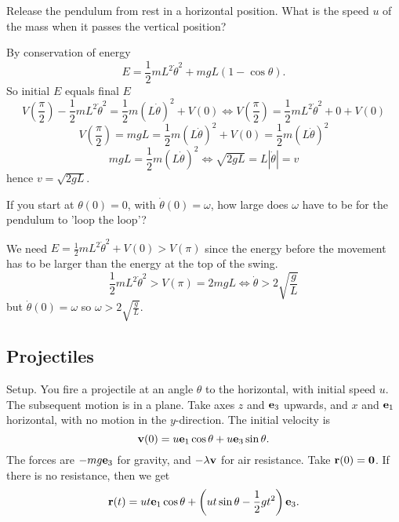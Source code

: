 \documentclass[10pt, a4paper]{article}
\begin{document}
\begin{example}
    Release the pendulum from rest in a horizontal position.
    What is the speed $u$ of the mass when it passes the vertical position?

    \begin{solution}
        By conservation of energy
        \[
        E = \frac{1}{2}mL ^ 2\dot{\theta} ^ 2 + mgL(1 - \cos{\theta}).
        \]
        So initial $E$ equals final $E$
        \[
        V\left(\frac{\pi}{2}\right) - \frac{1}{2}mL ^ 2\dot{\theta} ^ 2 = \frac{1}{2}m(L\dot{\theta}) ^ 2 + V(0) \iff V\left(\frac{\pi}{2}\right) = \frac{1}{2}mL ^ 2\dot{\theta} ^ 2 + 0 + V(0)
        \]
        \[
        V\left(\frac{\pi}{2}\right) = mgL = \frac{1}{2}m(L\dot{\theta}) ^ 2 + V(0) = \frac{1}{2}m(L\dot{\theta}) ^ 2
        \]
        \[
        mgL = \frac{1}{2}m(L\dot{\theta}) ^ 2 \iff \sqrt{2gL} = L|\dot{\theta}| = v
        \]
        hence $v = \sqrt{2gL}$.
    \end{solution}
\end{example}

\begin{example}
    If you start at $\theta(0) = 0$,
    with $\dot{\theta}(0) = \omega$,
    how large does $\omega$ have to be for the pendulum to 'loop the loop'?

    \begin{solution}
        We need $E = \frac{1}{2}mL ^ 2\dot{\theta} ^ 2 + V(0) > V(\pi)$ since the energy before the movement has to be larger than the energy at the top of the swing.
        \[
        \frac{1}{2}mL ^ 2\dot{\theta} ^ 2 > V(\pi) = 2mgL \iff \dot{\theta} > 2\sqrt{\frac{g}{L}}
        \]
        but $\dot{\theta}(0) = \omega$ so $\omega > 2\sqrt{\frac{g}{L}}$.
    \end{solution}
\end{example}

\subsection{Projectiles}
Setup.
You fire a projectile at an angle $\theta$ to the horizontal,
with initial speed $u$.
The subsequent motion is in a plane.
Take axes $z$ and $\mathbf{e}_3$ upwards,
and $x$ and $\mathbf{e}_1$ horizontal,
with no motion in the $y$-direction.
The initial velocity is
\[
\mathbf{v}(0) = u\mathbf{e}_1\cos{\theta} + u\mathbf{e}_3\sin{\theta}.
\]
The forces are $-mg\mathbf{e}_3$ for gravity,
and $-\lambda\mathbf{v}$ for air resistance.
Take $\mathbf{r}(0) = \mathbf{0}$.
If there is no resistance,
then we get
\[
\mathbf{r}(t) = ut\mathbf{e}_1\cos{\theta} + \left(ut\sin{\theta} - \frac{1}{2}gt ^ 2\right)\mathbf{e}_3.
\]
\end{document}
